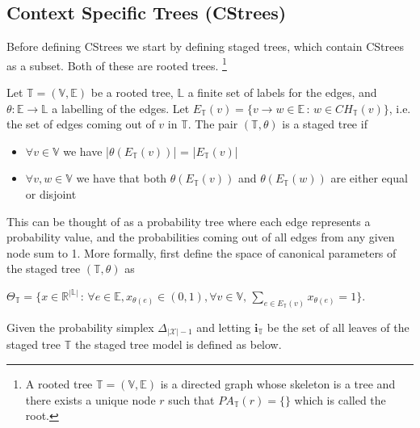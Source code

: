 \documentclass{tufte-book}
\begin{document}
\begin{Definition}
\section{Context Specific Trees (CStrees)}
\label{sec:org6307c57}
Before defining CStrees we start by defining staged trees, which contain CStrees as a subset. Both of these are rooted trees.  \footnote{A rooted tree $\mathbb{T} = (\mathbb{V},\mathbb{E})$ is a directed graph whose skeleton is a tree and there exists a unique node $r$ such that $PA_{\mathbb{T}}(r) = \{\}$ which is called the root.} 
   \begin{definition}
   Let $\mathbb{T} = (\mathbb{V},\mathbb{E})$ be a rooted tree, $\mathbb{L}$ a finite set of labels for the edges, and $\theta : \mathbb{E} \rightarrow \mathbb{L}$ a labelling of the edges. Let $E_{\mathbb{T}}(v) = \{v \rightarrow w \in \mathbb{E} \,:\, w \in CH_{\mathbb{T}}(v) \}$,   i.e. the set of edges coming out of $v$ in $\mathbb{T}$. The pair $(\mathbb{T}, \theta)$ is a staged tree if 
\begin{itemize}
\item  $\forall v \in \mathbb{V}$ we have |$\theta(E_{\mathbb{T}}(v))$| = |$E_{\mathbb{T}}(v)$|
\item $\forall v,w \in \mathbb{V}$ we have that both $\theta(E_\mathbb{T}(v))$ and $\theta(E_\mathbb{T}(w))$ are either equal or disjoint
\end{itemize}
\end{definition}

This can be thought of as a probability tree where each edge represents a probability value, and the probabilities coming out of all edges from any given node sum to 1. More formally, first define the space of canonical parameters of the staged tree \((\mathbb{T},\theta)\) as

$\Theta_{\mathbb{T}} = \{  x\in \mathbb{R}^{|\mathbb{L}|} \, : \, \forall e \in \mathbb{E}, x_{\theta(e)}\in (0,1), \forall v \in \mathbb{V}, \, \sum_{e \in E_{\mathbb{T}}(v)} x_{\theta(e)}=1 \}$.

Given the probability simplex \(\Delta_{|\mathcal{X}|-1}\) and letting \(\mathbf{i}_{\mathbb{T}}\) be the set of all leaves of the staged tree \(\mathbb{T}\)  the staged tree model is defined as below.



\end{Definition}
\end{document}
